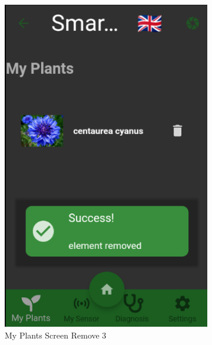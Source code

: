 \documentclass[a4paper,12pt]{report}
\begin{document}
\begin{figure}[H]
\begin{subfigure}{0.3\textwidth}
		\includegraphics[width=\textwidth]{./images/my_plants/my_plants_screen3_remove3.png}
		\caption{My Plants Screen Remove 3}
		\label{fig:my_plants_remove3}
	\end{subfigure}
	\hfill
	\begin{subfigure}{0.3\textwidth}

\end{subfigure}
\end{figure}
\end{document}
